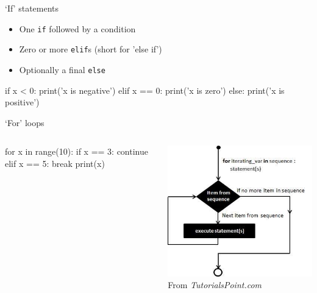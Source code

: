 \begin{frame}[fragile]{`If' statements}
    \begin{itemize}
        \item One \texttt{if} followed by a condition
        \item Zero or more \texttt{elif}s (short for 'else if')
        \item Optionally a final \texttt{else}
    \end{itemize}
    \vfill
    \begin{py3}
        if x < 0:
            print('x is negative')
        elif x == 0:
            print('x is zero')
        else:
            print('x is positive')
    \end{py3}
\end{frame}

\begin{frame}[fragile]{`For' loops}
    \begin{columns}
        \begin{column}{0.5\textwidth}
            \begin{py3}
                for x in range(10):
                    if x == 3:
                        continue
                    elif x == 5:
                        break
                    print(x)
            \end{py3}
        \end{column}
        \begin{column}{0.5\textwidth}
            \begin{center}
                \includegraphics[height=0.75\textheight]{figures/for_loop} \\
                {\scriptsize%
                 From \textit{TutorialsPoint.com}}
            \end{center}
        \end{column}
    \end{columns}
\end{frame}


